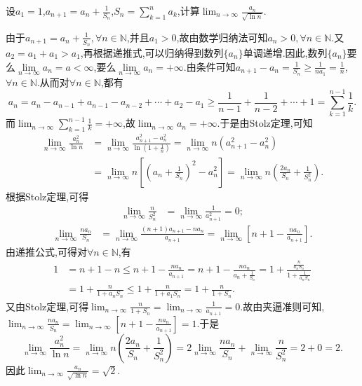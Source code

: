 \documentclass[../../main.tex]{subfiles}%
\begin{document}
\begin{example}
设\(a_1 = 1\),\(a_{n + 1} = a_n + \frac{1}{S_n}\),\(S_n = \sum\limits_{k = 1}^{n} a_k\),计算\(\lim_{n \to \infty} \frac{a_n}{\sqrt{\ln n}}\).
\end{example}
\begin{solution}
由于$a_{n + 1} = a_n + \frac{1}{S_n},\forall n\in \mathbb{N}$,并且$a_1>0$,故由数学归纳法可知$a_n>0,\forall n\in \mathbb{N}$.又$a_2=a_1+a_1>a_1$,再根据递推式,可以归纳得到数列$\{a_n\}$单调递增.因此,数列$\{a_n\}$要么$\underset{n\rightarrow \infty}{\lim}a_n=a<\infty $,要么$\underset{n\rightarrow \infty}{\lim}a_n=+\infty $.由条件可知\(a_{n + 1}-a_n=\frac{1}{S_n}\geqslant\frac{1}{na_1}=\frac{1}{n}\),\(\forall n\in\mathbb{N}\).从而对\(\forall n\in\mathbb{N}\),都有
\[
a_n=a_n - a_{n - 1}+a_{n - 1}-a_{n - 2}+\cdots+a_2 - a_1\geqslant\frac{1}{n - 1}+\frac{1}{n - 2}+\cdots+1=\sum_{k = 1}^{n - 1}\frac{1}{k}.
\]
而\(\lim_{n\rightarrow\infty}\sum_{k = 1}^{n - 1}\frac{1}{k}=+\infty\),故\(\lim_{n\rightarrow\infty}a_n=+\infty\).于是由Stolz定理,可知
\begin{align*}
\lim_{n\rightarrow\infty}\frac{a_n^2}{\ln n}&=\lim_{n\rightarrow\infty}\frac{a_{n + 1}^2 - a_n^2}{\ln(1+\frac{1}{n})}=\lim_{n\rightarrow\infty}n(a_{n + 1}^2 - a_n^2)\\
&=\lim_{n\rightarrow\infty}n\left[\left(a_n+\frac{1}{S_n}\right)^2 - a_n^2\right]=\lim_{n\rightarrow\infty}n\left(\frac{2a_n}{S_n}+\frac{1}{S_n^2}\right).
\end{align*}
根据Stolz定理,可得
\begin{align*}
\lim_{n\rightarrow\infty}\frac{n}{S_n^2}&=\lim_{n\rightarrow\infty}\frac{1}{a_{n + 1}^2}=0;
\end{align*}
\begin{align*}
\lim_{n\rightarrow\infty}\frac{na_n}{S_n}&=\lim_{n\rightarrow\infty}\frac{(n + 1)a_{n + 1}-na_n}{a_{n + 1}}=\lim_{n\rightarrow\infty}\left[n + 1-\frac{na_n}{a_{n + 1}}\right].
\end{align*}
由递推公式,可得对\(\forall n\in\mathbb{N}\),有
\begin{align*}
1&=n + 1 - n\leqslant n + 1-\frac{na_n}{a_{n + 1}}=n + 1-\frac{na_n}{a_n+\frac{1}{S_n}}=1+\frac{\frac{n}{a_nS_n}}{1+\frac{1}{a_nS_n}}\\
&=1+\frac{n}{1 + a_nS_n}\leqslant1+\frac{n}{1 + a_1S_n}=1+\frac{n}{1 + S_n}.
\end{align*}
又由Stolz定理,可得\(\lim_{n\rightarrow\infty}\frac{n}{1 + S_n}=\lim_{n\rightarrow\infty}\frac{1}{a_{n + 1}}=0\).故由夹逼准则可知,\(\lim_{n\rightarrow\infty}\frac{na_n}{S_n}=\lim_{n\rightarrow\infty}\left[n + 1-\frac{na_n}{a_{n + 1}}\right]=1\).于是
\[
\lim_{n\rightarrow\infty}\frac{a_n^2}{\ln n}=\lim_{n\rightarrow\infty}n\left(\frac{2a_n}{S_n}+\frac{1}{S_n^2}\right)=2\lim_{n\rightarrow\infty}\frac{na_n}{S_n}+\lim_{n\rightarrow\infty}\frac{n}{S_n^2}=2 + 0=2.
\]
因此\(\lim_{n\rightarrow\infty}\frac{a_n}{\sqrt{\ln n}}=\sqrt{2}\).

\end{solution}
\end{document}
